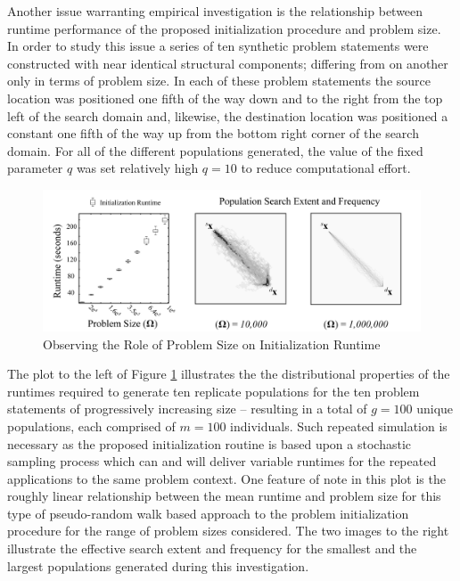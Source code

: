 Another issue warranting empirical investigation is the relationship between runtime performance of the proposed initialization procedure and problem size. In order to study this issue a series of ten synthetic problem statements were constructed with near identical structural components; differing from on another only in terms of problem size. In each of these problem statements the source location was positioned one fifth of the way down and to the right from the top left of the search domain and, likewise, the destination location was positioned a constant one fifth of the way up from the bottom right corner of the search domain. For all of the different populations generated, the value of the fixed parameter $q$ was set relatively high $q = 10$ to reduce computational effort.
            
            \begin{figure}[!h]
            \centering
            \includegraphics[width=5.5in]{figures/problem-size-study.png}
            \caption[Observing the Role of Problem Size on Initialization Runtime]{Observing the Role of Problem Size on Initialization Runtime}
            \label{fig:problem-size}
            \end{figure}
            
The plot to the left of Figure \ref{fig:problem-size} illustrates the the distributional properties of the runtimes required to generate ten replicate populations for the ten problem statements of progressively increasing size – resulting in a total of $g = 100$ unique populations, each comprised of $m = 100$ individuals. Such repeated simulation is necessary as the proposed initialization routine is based upon a stochastic sampling process which can and will deliver variable runtimes for the repeated applications to the same problem context. One feature of note in this plot is the roughly linear relationship between the mean runtime and problem size for this type of pseudo-random walk based approach to the problem initialization procedure for the range of problem sizes considered. The two images to the right illustrate the effective search extent and frequency for the smallest and the largest populations generated during this investigation.
            

